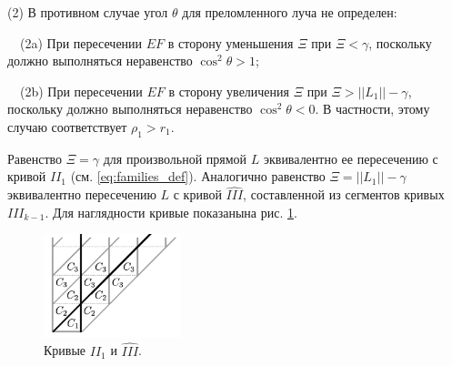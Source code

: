 (2) В противном случае угол $\theta$ для преломленного луча не определен:

$\quad $(2a) При пересечении $EF$ в сторону уменьшения $\Xi$ при $\Xi < \gamma$, поскольку должно выполняться неравенство $\cos^2 \theta > 1$;

$\quad $(2b) При пересечении $EF$ в сторону увеличения $\Xi$ при $\Xi > ||L_1|| - \gamma$, поскольку должно выполняться неравенство $\cos^2 \theta < 0$. В частности, этому случаю соответствует $\rho_1 > r_1$.

Равенство $\Xi = \gamma$ для произвольной прямой $L$ эквивалентно ее пересечению с кривой $II_1$ (см. \ref{eq:families_def}). Аналогично равенство $\Xi = ||L_1||-\gamma$ эквивалентно пересечению $L$ с кривой $\widehat{III}$, составленной из сегментов кривых $III_{k-1}$. 
%
%
Для наглядности кривые показанына рис. \ref{fig:pt10:_B1_lattice_straight_with_line}.
\begin{figure}[!htb]
\centering
\includegraphics[width=4cm]{images/ch4/section3_circular/B1_lattice_straight_with_line.pdf}
    \caption{Кривые $II_1$ и $\widehat{III}$.}
    \label{fig:pt10:_B1_lattice_straight_with_line}
\end{figure}

